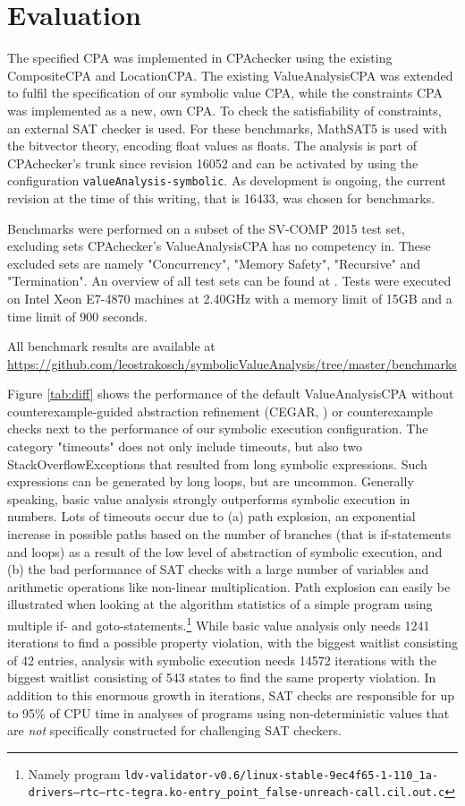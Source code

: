 \section{Evaluation}
The specified CPA was implemented in CPAchecker\cite{Beyer2011} using the existing CompositeCPA and LocationCPA.
The existing ValueAnalysisCPA  was extended to fulfil the specification of our symbolic value CPA,
while the constraints CPA was implemented as a new, own CPA. To check the satisfiability of constraints, an external SAT checker is used. For these benchmarks, MathSAT5 is used with the bitvector theory, encoding float values as floats.
The analysis is part of CPAchecker's trunk since revision 16052 and can be activated by using the configuration \texttt{valueAnalysis-symbolic}. As development is ongoing, the current revision at the time of this writing, that is 16433, was chosen for benchmarks.

Benchmarks were performed on a subset of the SV-COMP 2015 test set, excluding sets CPAchecker's ValueAnalysisCPA has no competency in.
These excluded sets are namely "Concurrency", "Memory Safety", "Recursive" and "Termination". An overview of all test sets can be found at \cite{SV15Tasks}.
Tests were executed on Intel Xeon E7-4870 machines at 2.40GHz with a memory limit of 15GB and a time limit of 900 seconds.

All benchmark results are available at \url{https://github.com/leostrakosch/symbolicValueAnalysis/tree/master/benchmarks}

Figure \ref{tab:diff} shows the performance of the default ValueAnalysisCPA without counterexample-guided abstraction refinement (CEGAR, \cite{Beyer2013}) or counterexample checks next to the performance of our symbolic execution configuration. The category "timeouts" does not only include timeouts, but also two StackOverflowExceptions that resulted from long symbolic expressions. Such expressions can be generated by long loops, but are uncommon.
Generally speaking, basic value analysis strongly outperforms symbolic execution in numbers.
Lots of timeouts occur due to
(a) path explosion, an exponential increase in possible paths based on the number of branches (that is if-statements and loops) as a result of the low level of abstraction of symbolic execution, and
(b) the bad performance of SAT checks with a large number of variables and arithmetic operations like non-linear multiplication.
Path explosion can easily be illustrated when looking at the algorithm statistics of a simple program using multiple if- and goto-statements.\footnote{Namely program \texttt{ldv-validator-v0.6/linux-stable-9ec4f65-1-110\_1a-drivers--rtc--rtc-tegra.ko-entry\_point\_false-unreach-call.cil.out.c}}
While basic value analysis only needs 1241 iterations to find a possible property violation, with the biggest waitlist consisting of 42 entries,
analysis with symbolic execution needs 14572 iterations with the biggest waitlist consisting of 543 states to find the same property violation.
In addition to this enormous growth in iterations, SAT checks are responsible for up to 95\% of CPU time in analyses of programs using non-deterministic values that are \emph{not} specifically constructed for challenging SAT checkers.

